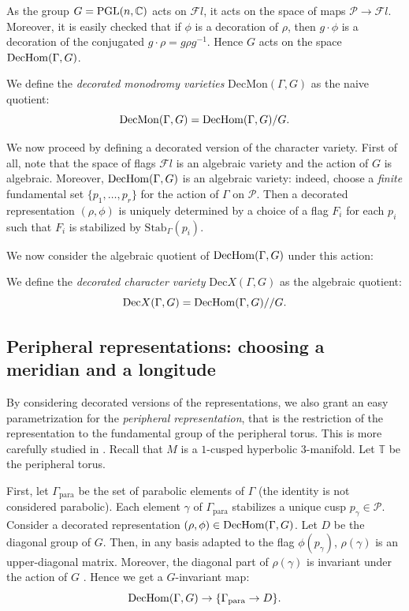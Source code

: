 As the group $G=\textrm{PGL}(n,\mathbb{C})$ acts on $\mathcal Fl$, it acts on the space of maps $\mathcal P\to \mathcal Fl.$
Moreover, it is easily checked that if $\phi$ is a decoration of $\rho$, then $g\cdot \phi$ is a decoration of the conjugated $g\cdot \rho=g\rho g^{-1} $. 
Hence $G$ acts on the space $\mathrm{DecHom}(\Gamma,G)$. 

\newcommand{\DecMon}{\mathrm{DecMon}}

\begin{defn}
We define the \emph{decorated monodromy varieties} $\DecMon(\Gamma,G)$ as the naive quotient:
$$\DecMon(\Gamma,G)=\DecHom(\Gamma,G)/G.$$
\end{defn}


We now proceed by defining a decorated version of the character variety. 
First of all, note that the space of flags $\mathcal Fl$ is an algebraic variety and the action of $G$ is algebraic. 
Moreover, $\mathrm{DecHom}(\Gamma,G)$ is an algebraic variety: indeed, choose a \emph{finite} fundamental set $\{p_1,\ldots,p_r\}$ for the action of $\Gamma$ on $\mathcal P$. 
Then a decorated representation $(\rho,\phi)$ is uniquely determined by a choice of a flag $F_i$ for each $p_i$ such that $F_i$ is stabilized by $\mathrm{Stab}_\Gamma(p_i)$.

\newcommand{\DecX}{\mathrm{Dec}X}

We now consider the algebraic quotient of $\mathrm{DecHom}(\Gamma,G)$ under this action:
\begin{defn}
We define the \emph{decorated character variety} $\DecX(\Gamma,G)$ as the algebraic quotient:
$$\DecX(\Gamma,G)=\DecHom(\Gamma,G)//G.$$
\end{defn}



\subsection{Peripheral representations: choosing a meridian and a longitude}\label{ss:lm}
\newcommand{\Hol}{\mathrm{Hol}}\newcommand{\periph}{\mathrm{periph}}

By considering decorated versions of the representations, we also grant an easy parametrization 
for the \emph{peripheral representation}, that is the restriction of the representation to the fundamental group of the peripheral torus. This is more carefully studied in \cite[Section 1]{G}. Recall that $M$ is a $1$-cusped hyperbolic $3$-manifold. Let $\mathbb T$ be the peripheral torus.

First, let $\Gamma_\mathrm{para}$ be the set of parabolic elements of $\Gamma$ (the identity is not considered parabolic). 
Each element $\gamma$ of $\Gamma_\mathrm{para}$ stabilizes a unique cusp $p_\gamma\in\mathcal P$. 
Consider a decorated representation $(\rho,\phi)\in \mathrm{DecHom}(\Gamma,G)$. 
Let $D$ be the diagonal group of $G$. Then, in any basis adapted to the flag $\phi(p_\gamma)$,
$\rho(\gamma)$ is an upper-diagonal matrix. Moreover, the diagonal part of $\rho(\gamma)$ is invariant under the action of $G$ \cite{G}.
Hence we get a $G$-invariant map: 
$$\mathrm{DecHom}(\Gamma,G)  \to \{\Gamma_\mathrm{para}\to D\}.$$
\newcommand{\dec}{\mathrm{dec}}



